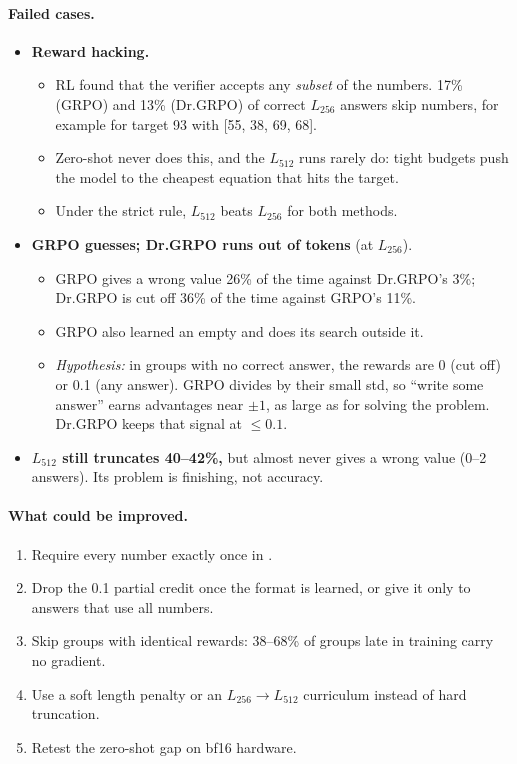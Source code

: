 \documentclass[10.5pt]{article}
\begin{document}
\paragraph{Failed cases.}
\begin{itemize}
\item \textbf{Reward hacking.}
  \begin{itemize}
  \item RL found that the verifier accepts any \emph{subset} of the numbers. 17\% (GRPO) and 13\% (Dr.GRPO) of correct
    $L_{256}$ answers skip numbers, for example  for target 93 with [55, 38, 69, 68].
  \item Zero-shot never does this, and the $L_{512}$ runs rarely do: tight budgets push the model to the cheapest
    equation that hits the target.
  \item Under the strict rule, $L_{512}$ beats $L_{256}$ for both methods.
  \end{itemize}
\item \textbf{GRPO guesses; Dr.GRPO runs out of tokens} (at $L_{256}$).
  \begin{itemize}
  \item GRPO gives a wrong value 26\% of the time against Dr.GRPO's 3\%; Dr.GRPO is cut off 36\% of the time against
    GRPO's 11\%.
  \item GRPO also learned an empty  and does its search outside it.
  \item \emph{Hypothesis:} in groups with no correct answer, the rewards are 0 (cut off) or 0.1 (any answer). GRPO divides
    by their small std, so ``write some answer'' earns advantages near $\pm1$, as large as for solving the problem.
    Dr.GRPO keeps that signal at $\le0.1$.
  \end{itemize}
\item \textbf{$L_{512}$ still truncates 40--42\%,} but almost never gives a wrong value (0--2 answers). Its problem is
  finishing, not accuracy.
\end{itemize}

\paragraph{What could be improved.}
\begin{enumerate}
\item Require every number exactly once in .
\item Drop the 0.1 partial credit once the format is learned, or give it only to answers that use all numbers.
\item Skip groups with identical rewards: 38--68\% of groups late in training carry no gradient.
\item Use a soft length penalty or an $L_{256}\to L_{512}$ curriculum instead of hard truncation.
\item Retest the zero-shot gap on bf16 hardware.
\end{enumerate}
\end{document}
